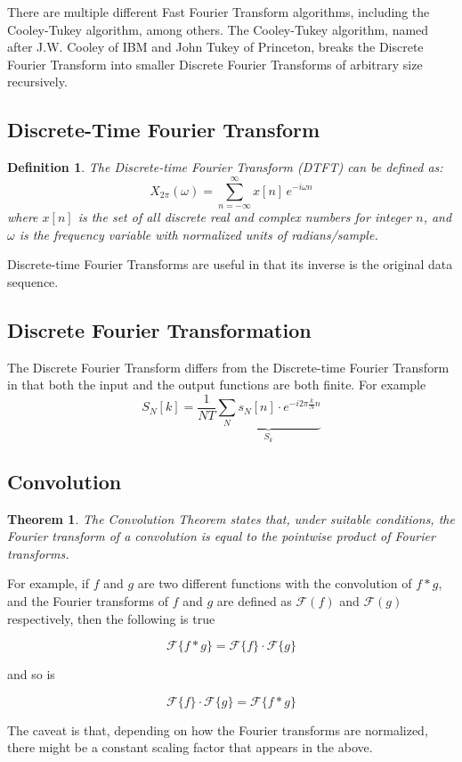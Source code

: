 \documentclass{article}
\newtheorem{theorem}{Theorem}
\newtheorem{definition}{Definition}
\begin{document}
There are multiple different Fast Fourier Transform algorithms, including the Cooley-Tukey algorithm, among others. The Cooley-Tukey algorithm, named after J.W. Cooley of IBM and John Tukey of Princeton, breaks the Discrete Fourier Transform into smaller Discrete Fourier Transforms of arbitrary size recursively.
\subsection{Discrete-Time Fourier Transform}
\begin{definition}
	The {\em Discrete-time Fourier Transform (DTFT)} can be defined as:
	$$X_{2\pi}(\omega) = \sum_{n=-\infty}^{\infty} x[n] \,e^{-i \omega n}$$
	where $x[n]$ is the set of all discrete real and complex numbers for integer $n$, and $\omega$ is the frequency variable with normalized units of radians/sample.
\end{definition}

Discrete-time Fourier Transforms are useful in that its inverse is the original data sequence.
\subsection{Discrete Fourier Transformation}
The Discrete Fourier Transform differs from the Discrete-time Fourier Transform in that both the input and the output functions are both finite. For example
$$S_N[k] =\frac{1}{NT} \underbrace{\sum_N s_N[n]\cdot e^{-i 2\pi \frac{k}{N} n}}_{S_k}$$
\subsection{Convolution}
\begin{theorem}
	The Convolution Theorem states that, under suitable conditions, the Fourier transform of a convolution is equal to the pointwise product of Fourier transforms.
\end{theorem}

For example, if $f$ and $g$ are two different functions with the convolution of $f*g$, and the Fourier transforms of $f$ and $g$ are defined as $\mathcal{F}(f)$ and $\mathcal{F}(g)$ respectively, then the following is true

$$\mathcal{F}\{f*g\} = \mathcal{F}\{f\} \cdot \mathcal{F}\{g\}$$

and so is 

$$\mathcal{F}\{f\} \cdot \mathcal{F}\{g\} = \mathcal{F}\{f*g\}$$

The caveat is that, depending on how the Fourier transforms are normalized, there might be a constant scaling factor that appears in the above. 
\end{document}

